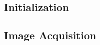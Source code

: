 \subsection{Initialization}
\label{subsec:inference:app:initialization}










\subsection{Image Acquisition}
\label{subsec:inference:app:image_acquisition}



































